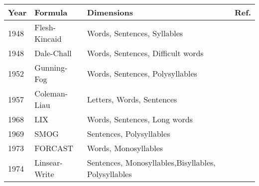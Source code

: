 \begin{tabular}{|l|l|p{70mm}|c|} \hline
\textbf{Year} & \textbf{Formula} & \textbf{Dimensions} & \textbf{Ref.} \\ \hline
1948 & Flesh-Kincaid & Words, Sentences, Syllables &  \\ \hline
1948 & Dale-Chall & Words, Sentences, Difficult words &  \\ \hline
1952 & Gunning-Fog & Words, Sentences, Polysyllables &  \\ \hline
1957 & Coleman-Liau & Letters, Words, Sentences &  \\ \hline
1968 & LIX & Words, Sentences, Long words &  \\ \hline
1969 & SMOG & Sentences, Polysyllables &  \\ \hline
1973 & FORCAST & Words, Monosyllables &  \\ \hline
1974 & Linsear-Write & Sentences, Monosyllables,\newline  Bisyllables, Polysyllables &  \\ \hline
\end{tabular}